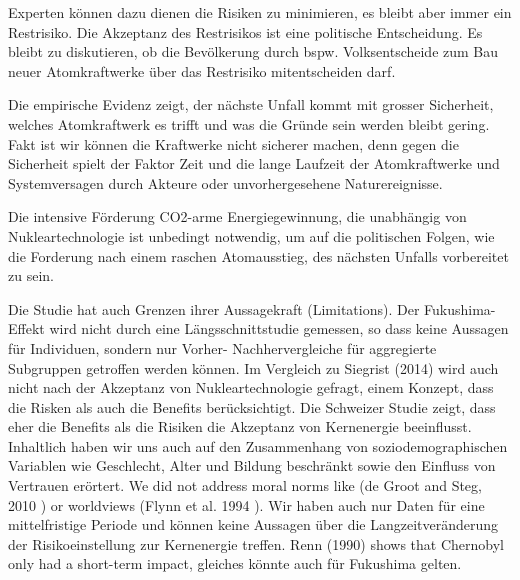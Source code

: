 Experten können dazu dienen die Risiken zu minimieren, es bleibt aber immer ein Restrisiko. Die Akzeptanz des Restrisikos ist eine politische Entscheidung. Es bleibt zu diskutieren, ob die Bevölkerung durch bspw. Volksentscheide zum Bau neuer Atomkraftwerke über das Restrisiko mitentscheiden darf. 
    
Die empirische Evidenz zeigt, der nächste Unfall kommt mit grosser Sicherheit, welches Atomkraftwerk es trifft und was die Gründe sein werden bleibt gering. Fakt ist wir können die Kraftwerke nicht sicherer machen, denn gegen die Sicherheit spielt der Faktor Zeit und die lange Laufzeit der Atomkraftwerke und Systemversagen durch Akteure oder unvorhergesehene Naturereignisse. 
    
Die intensive Förderung CO2-arme Energiegewinnung, die unabhängig von Nukleartechnologie ist unbedingt notwendig, um auf die politischen Folgen, wie die Forderung nach einem raschen Atomausstieg, des nächsten Unfalls vorbereitet zu sein. 
   



Die Studie hat auch Grenzen ihrer Aussagekraft (Limitations). Der Fukushima-Effekt wird nicht durch eine Längsschnittstudie gemessen, so dass keine Aussagen für Individuen, sondern nur Vorher- Nachhervergleiche für aggregierte Subgruppen getroffen werden können. Im Vergleich zu Siegrist (2014) wird auch nicht nach der Akzeptanz von Nukleartechnologie gefragt, einem Konzept, dass die Risken als auch die Benefits berücksichtigt. Die Schweizer Studie zeigt, dass eher die Benefits als die Risiken die Akzeptanz von Kernenergie beeinflusst. Inhaltlich haben wir uns auch auf den Zusammenhang von soziodemographischen Variablen wie Geschlecht, Alter und Bildung beschränkt sowie den Einfluss von Vertrauen erörtert. We did not address moral norms like (de Groot and Steg, 2010 \citep{deGroot:2010ez}) or worldviews (Flynn et al. 1994 ). 
Wir haben auch nur Daten für eine mittelfristige Periode und können keine Aussagen über die Langzeitveränderung der Risikoeinstellung zur Kernenergie treffen. Renn (1990) shows that Chernobyl only had a short-term impact, gleiches könnte auch für Fukushima gelten.                                         
      








